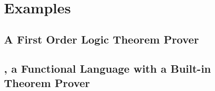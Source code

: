 \section{Examples}

\subsection{A First Order Logic Theorem Prover}

\label{example1}



\subsection{\Funl{}, a Functional Language with a Built-in Theorem Prover}

\label{example2}


